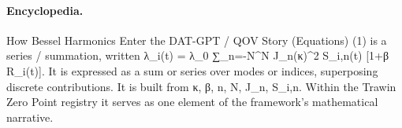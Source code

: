 \paragraph{Encyclopedia.}
How Bessel Harmonics Enter the DAT-GPT / QOV Story (Equations) (1) is a series / summation, written λ\_i(t) = λ\_0 ∑\_n=-N\textasciicircum{}N J\_n(κ)\textasciicircum{}2 S\_i,n(t) [1+β R\_i(t)]. It is expressed as a sum or series over modes or indices, superposing discrete contributions. It is built from κ, β, n, N, J\_n, S\_i,n. Within the Trawin Zero Point registry it serves as one element of the framework's mathematical narrative.
